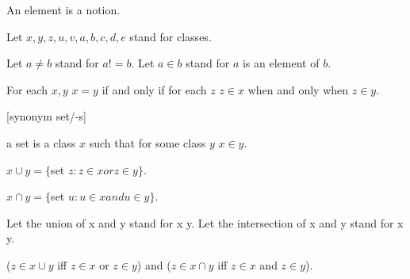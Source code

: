 \documentclass[a4paper,draft]{amsproc}
\begin{document}
\begin{forthel}

\begin{signature}[ElmSort]
An element is a notion.
\end{signature}


Let $x, y, z, u, v, a, b, c, d, e$ stand for classes.

Let $a \neq b$ stand for $a != b$.
Let $a \in b$ stand for $a$ is an element of $b$.

\begin{axiom}[I] 
For each $x, y $ 
$x = y$ if and only if for each $z$ $z \in x$ 
when and only when $z \in y$.
\end{axiom}


[synonym set/-s]

\begin{definition}[1]
a set is a class $x$ such that for some class $y$ $x \in y$.
\end{definition}


\begin{definition}[2] 
$x \cup y = \{$set $z : z \in x or z \in y \}$.
\end{definition}

\begin{definition}[3] 
$x \cap y = \{$set $u : u \in x and u \in y \}$.
\end{definition}

Let the union of x and y stand for x \cup y.
Let the intersection of x and y stand for x \cap y.

\begin{theorem}[4]
($z \in x \cup y$ iff $z \in x$ or $z \in y$)
and ($z \in x \cap y$ iff $z \in x$ and $z \in y$).
\end{theorem}


\end{forthel}
\end{document}
